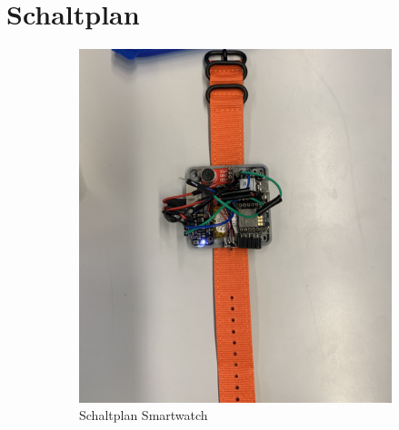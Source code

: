 \documentclass[a4paper, 11pt]{article}
\begin{document}
\section{Schaltplan}
\begin{figure}[H]
    \centering
    \begin{subfigure}{0.49\textwidth}
        \centering
        \includegraphics[width=\textwidth]{images/verkabelte_Smartwatch.JPEG}
        \caption{Schaltplan Smartwatch}
        \label{fig:Schaltplan Smartwatch}
    \end{subfigure}
    \begin{subfigure}{0.49\textwidth}
        \centering

\end{subfigure}
\end{figure}
\end{document}
